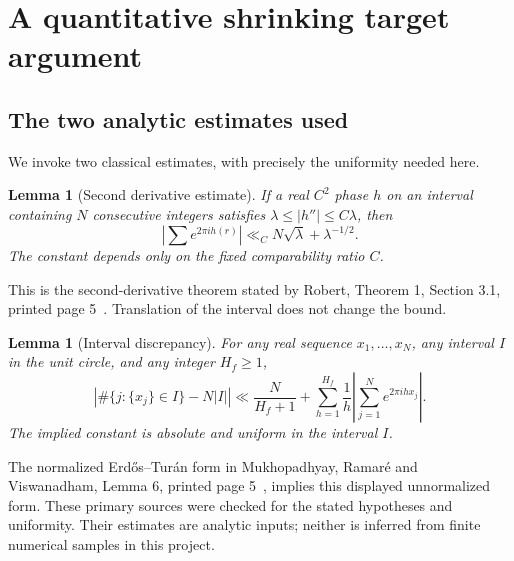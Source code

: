 \documentclass[11pt,letterpaper]{article}
\newtheorem{lemma}[theorem]{Lemma}
\theoremstyle{definition}\newtheorem{definition}[theorem]{Definition}
\theoremstyle{remark}\newtheorem{remark}[theorem]{Remark}
\begin{document}
\section{A quantitative shrinking target argument}\label{fup:nr:sec:discrepancy}
\subsection{The two analytic estimates used}
We invoke two classical estimates, with precisely the uniformity needed here.

\begin{lemma}[Second derivative estimate]\label{fup:nr:lem:vdc}
If a real $C^2$ phase $h$ on an interval containing $N$ consecutive integers satisfies $\lambda\le|h''|\le C\lambda$, then
\[
 \left|\sum e^{2\pi i h(r)}\right|
 \ll_C N\sqrt\lambda+\lambda^{-1/2}.
\]
The constant depends only on the fixed comparability ratio $C$.
\end{lemma}
This is the second-derivative theorem stated by Robert, Theorem 1, Section 3.1, printed page 5~\cite{fup:nr:robert}. Translation of the interval does not change the bound.

\begin{lemma}[Interval discrepancy]\label{fup:nr:lem:ET}
For any real sequence $x_1,\ldots,x_N$, any interval $I$ in the unit circle, and any integer $H_f\ge1$,
\[
 \left|\#\{j:\{x_j\}\in I\}-N|I|\right|
 \ll\frac{N}{H_f+1}+
 \sum_{h=1}^{H_f}\frac1h\left|\sum_{j=1}^Ne^{2\pi ihx_j}\right|.
\]
The implied constant is absolute and uniform in the interval $I$.
\end{lemma}
The normalized Erd\H{o}s--Tur\'an form in Mukhopadhyay, Ramar\'e and Viswanadham, Lemma 6, printed page 5~\cite{fup:nr:discrepancy}, implies this displayed unnormalized form. These primary sources were checked for the stated hypotheses and uniformity. Their estimates are analytic inputs; neither is inferred from finite numerical samples in this project.
\end{document}
